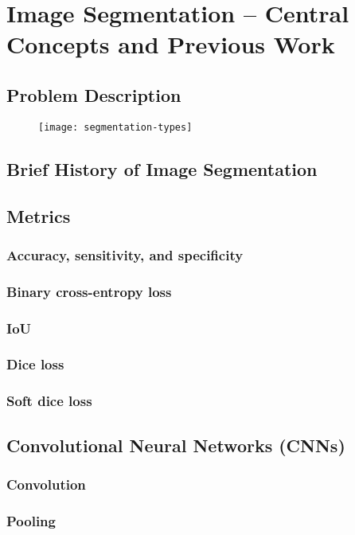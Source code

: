 \section{Image Segmentation -- Central Concepts and Previous Work}

\subsection{Problem Description}

\begin{figure}[htb]
  \texttt{[image: segmentation-types]}
\end{figure}

\subsection{Brief History of Image Segmentation}

\subsection{Metrics}
  \subsubsection{Accuracy, sensitivity, and specificity}
  \subsubsection{Binary cross-entropy loss}
  \subsubsection{IoU}
  \subsubsection{Dice loss}
  \subsubsection{Soft dice loss}

\subsection{Convolutional Neural Networks (CNNs)}
  \subsubsection{Convolution}
  \subsubsection{Pooling}

